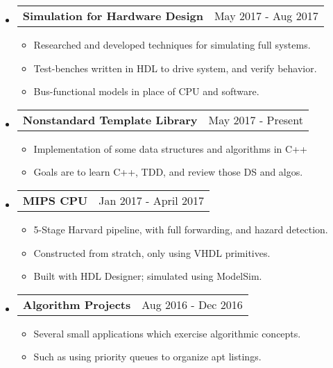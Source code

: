 \documentclass[18pt]{article}
\makeatletter
\providecommand{\tightlist}{
    \setlength{\itemsep}{0pt}\setlength{\parskip}{0pt}
}
\providecommand{\datetable}[2]{
    \begin{tabular*}{\textwidth}{@{}r @{\extracolsep{\fill}} l}
        #1 & #2
    \end{tabular*}
}
\makeatother
\begin{document}
    \begin{itemize}[label={}]\tightlist
        
        \item \datetable{\textbf{Simulation for Hardware Design}}
        {May 2017 - Aug 2017}
        \begin{itemize}\tightlist
            \item Researched and developed techniques for simulating full systems.
            \item Test-benches written in HDL to drive system, and verify behavior.
            \item Bus-functional models in place of CPU and software.
        \end{itemize}
        
      \item \datetable{\textbf{Nonstandard Template Library}}
      {May 2017 - Present}
      \begin{itemize}\tightlist
        \item Implementation of some data structures and algorithms in C++
        \item Goals are to learn C++, TDD, and review those DS and algos.
      \end{itemize}
          
      \item \datetable{\textbf{MIPS CPU}}{Jan 2017 - April 2017}
      \begin{itemize}\tightlist
        \item 5-Stage Harvard pipeline, with full forwarding, and hazard detection.
        \item Constructed from stratch, only using VHDL primitives.
        \item Built with HDL Designer; simulated using ModelSim.
      \end{itemize}
      
      
      \item \datetable{\textbf{Algorithm Projects}}{Aug 2016 - Dec 2016}
      \begin{itemize}\tightlist
        \item Several small applications which exercise algorithmic concepts.
        \item Such as using priority queues to organize apt listings.
      \end{itemize}
        

\end{itemize}
\end{document}
